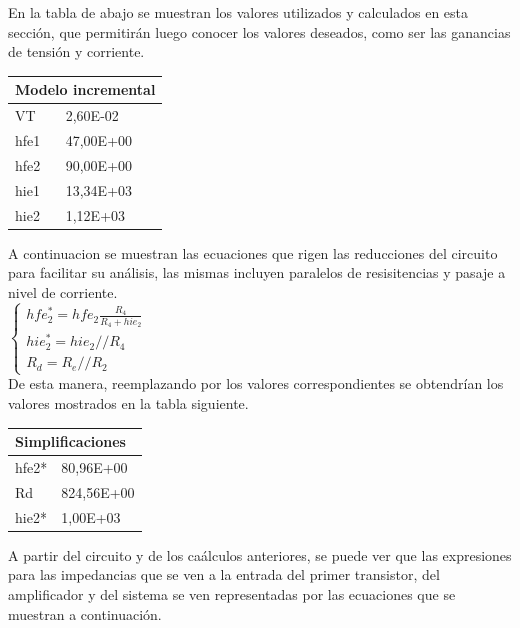 En la tabla de abajo se muestran los valores utilizados y calculados en esta sección, que permitirán luego conocer los valores deseados, como ser las ganancias de tensión y corriente.

\begin{table}[H]
\centering
\begin{tabular}{ll}
\multicolumn{2}{l}{Modelo incremental} \\ \hline
VT              & 2,60E-02             \\
hfe1            & 47,00E+00            \\
hfe2            & 90,00E+00            \\
hie1            & 13,34E+03            \\
hie2            & 1,12E+03             \\
\end{tabular}
\label{tabla valores} 
\end{table}

A continuacion se muestran las ecuaciones que rigen las reducciones del circuito para facilitar su análisis, las mismas incluyen paralelos de resisitencias y pasaje a nivel de corriente. \\

		$
		\begin{cases}
		hfe_{2}^{*}=hfe_{2}\frac{R_{4}}{R_{4}+hie_{2}} \\
		hie_{2}^{*}=hie_{2}//R_{4} \\
		R_{d}=R_{e}//R_{2}
		\end{cases}
		\label{mod_inc_ecs}
		$ \\

De esta manera, reemplazando por los valores correspondientes se obtendrían los valores mostrados en la tabla siguiente.

\begin{table}[H]
\centering
\begin{tabular}{ll}
\multicolumn{2}{l}{Simplificaciones} \\ \hline
hfe2*          & 80,96E+00           \\
Rd             & 824,56E+00          \\
hie2*          & 1,00E+03           
\end{tabular}
\end{table}

A partir del circuito y de los caálculos anteriores, se puede ver que las expresiones para las impedancias que se ven a la entrada del primer transistor, del amplificador y del sistema se ven representadas por las ecuaciones que se muestran a continuación. \\

